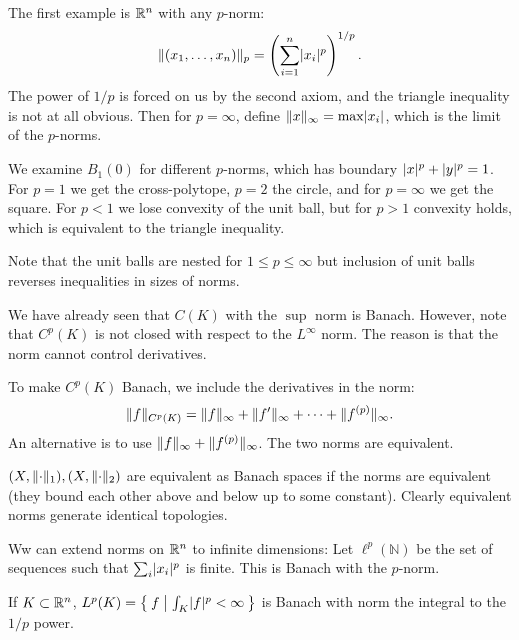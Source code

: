 \documentclass[10pt, twoside]{article}
\begin{document}
    \begin{exm}
        The first example is $\mathbb{R}^n$ with any $p$-norm: \[\lVert(x_1, \ldots, x_n)\rVert_p = \left( \sum_{i=1}^n \lvert x_i\rvert^p \right)^{1/p}.\] The power of $1/p$ is forced on us by the second axiom, and the triangle inequality is not at all obvious. Then for $p = \infty$, define $\lVert x\rVert_{\infty} = \max \lvert x_i\rvert$, which is the limit of the $p$-norms.

        We examine $B_1(0)$ for different $p$-norms, which has boundary $\lvert x\rvert^p + \lvert y\rvert^p = 1$. For $p = 1$ we get the cross-polytope, $p=2$ the circle, and for $p = \infty$ we get the square. For $p<1$ we lose convexity of the unit ball, but for $p>1$ convexity holds, which is equivalent to the triangle inequality.

        Note that the unit balls are nested for $1 \leq p \leq \infty$ but inclusion of unit balls reverses inequalities in sizes of norms.
    \end{exm}
    
    \begin{exm}
        We have already seen that $C(K)$ with the $\sup$ norm is Banach. However, note that $C^p(K)$ is not closed with respect to the $L^{\infty}$ norm. The reason is that the norm cannot control derivatives.

        To make $C^p(K)$ Banach, we include the derivatives in the norm:
        \[\lVert f\rVert_{C^p(K)} = \lVert f\rVert_{\infty} + \lVert f'\rVert_{\infty} + \cdots + \lVert f^{(p)}\rVert_{\infty}.\] An alternative is to use $\lVert f\rVert_{\infty} + \lVert f^{(p)}\rVert_{\infty}$. The two norms are equivalent.
    \end{exm}

    \begin{defn}
        $(X, \lVert\cdot\rVert_1), (X, \lVert\cdot\rVert_2)$ are equivalent as Banach spaces if the norms are equivalent (they bound each other above and below up to some constant). Clearly equivalent norms generate identical topologies.
    \end{defn}

    \begin{exm}
        Ww can extend norms on $\mathbb{R}^n$ to infinite dimensions: Let $\ell^p(\mathbb{N})$ be the set of sequences such that $\sum_{i} \lvert x_i\rvert^p$ is finite. This is Banach with the $p$-norm.
    \end{exm}

    \begin{exm}
        If $K \subset \mathbb{R}^n$, $L^p(K) = \Set{f | \int_K \lvert f\rvert^p < \infty}$ is Banach with norm the integral to the $1/p$ power.
    \end{exm}
\end{document}
